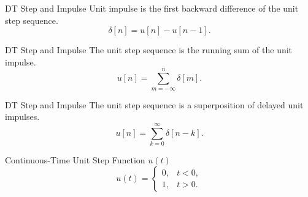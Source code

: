\begin{frame}[plain]{DT Step and Impulse}
    Unit impulse is the first backward difference of the unit step sequence.
    \begin{equation}
        \delta[n] = u[n] - u[n-1].
    \end{equation}
    {
        \vspace{1in}
    }

    {
        {
            \centering
            
        }
    }
\end{frame}

\begin{frame}[plain]{DT Step and Impulse}
    The unit step sequence is the running sum of the unit impulse.
    \begin{equation}
        u[n] = \sum_{m=-\infty}^{n}\delta[m].
    \end{equation}
    {
        \vspace{1in}
    }
    \pause
    {
        {
            \centering
            
        }
    }
\end{frame}




\begin{frame}[plain]{DT Step and Impulse}
    The unit step sequence is a superposition of delayed unit impulses.
    \begin{equation}
        u[n] = \sum_{k=0}^{\infty}\delta[n-k].
    \end{equation}
    {
        \vspace{1in}
    }
    \pause
    {
        {
            \centering
            
        }
    }
\end{frame}





\begin{frame}[plain]{Continuous-Time Unit Step Function $u(t)$}
    \begin{equation}
        u(t) = \begin{cases}
                 0, & t < 0,\\
                 1, & t>0.
               \end{cases}
    \end{equation}
    {
        {
            \centering
            
        }
    }
\end{frame}



